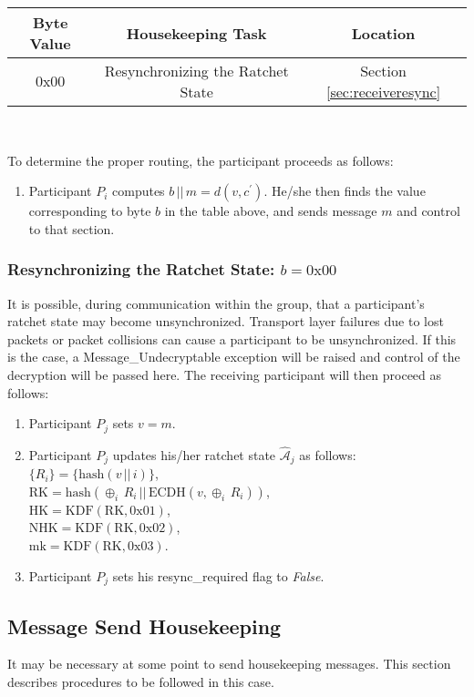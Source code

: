 \documentclass[%
preprint,
amsmath,amssymb,
aps,
prb,
floatfix,
]{revtex4-1}
\begin{document}
\begin{centering}
\begin{tabular}{|c|c|c|}
\hline
Byte Value & Housekeeping Task & Location \\
\hline
$0\mathrm{x}00$ & Resynchronizing the Ratchet State  & Section \ref{sec:receiveresync}\\
\hline
\end{tabular} \\
\end{centering}
\bigskip
To determine the proper routing, the
participant proceeds as follows:
\begin{enumerate}
\item Participant $P_i$ computes $b \, || \, m = d(v, c^\prime)$. He/she then
finds the value corresponding to byte $b$ in the table above, and sends message
$m$ and control to that section.
\end{enumerate}
\subsubsection{\label{sec:receiveresync}Resynchronizing the Ratchet State: $b =
0\mathrm{x}00$}
It is possible, during communication within the group, that a participant's
ratchet state may become unsynchronized. Transport layer failures due to lost
packets or packet collisions can cause a participant to be unsynchronized. If
this is the case, a Message\_Undecryptable exception will be raised
and control of the decryption will be passed here. The receiving participant
will then proceed as follows:
\begin{enumerate}
\item Participant $P_j$ sets $v = m$.
\item Participant $P_j$ updates his/her ratchet state
$\mathcal{\hat{A}}_j$ as follows:\\
$\{R_i\} = \{ \mathrm{hash}(v \, || \, i)\}$, \\
$\mathrm{RK} = \mathrm{hash}(\oplus_i \, R_i \, || \, \mathrm{ECDH}(v, \oplus_i
\, R_i))$, \\
$\mathrm{HK} = \mathrm{KDF}(\mathrm{RK}, 0\mathrm{x}01)$, \\
$\mathrm{NHK} = \mathrm{KDF}(\mathrm{RK}, 0\mathrm{x}02)$, \\
$\mathrm{mk} = \mathrm{KDF}(\mathrm{RK}, 0\mathrm{x}03)$.
\item Participant $P_j$ sets his resync\_required flag to \textit{False}.
\end{enumerate}

\subsection{\label{sec:sendhousekeeping}Message Send Housekeeping}
It may be necessary at some point to send housekeeping messages. This section
describes procedures to be followed in this case.
\end{document}
